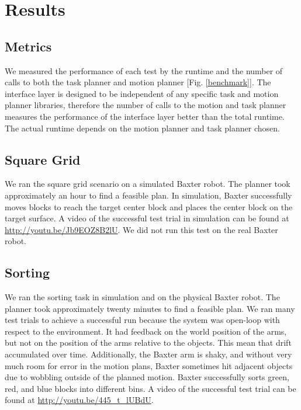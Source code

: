 \documentclass[12pt]{article}
\begin{document}
\section{Results}
\subsection{Metrics}
We measured the performance of each test by the runtime and the number of calls to both the task planner and motion planner [Fig. \ref{benchmark}]. 
The interface layer is designed to be independent of any specific task and motion planner libraries, therefore the number of calls to the motion and task planner measures the performance of the interface layer better than the total runtime. 
The actual runtime depends on the motion planner and task planner chosen.

\subsection{Square Grid}
We ran the square grid scenario on a simulated Baxter robot.
The planner took approximately an hour to find a feasible plan. 
In simulation, Baxter successfully moves blocks to reach the target center block and places the center block on the target surface.
A video of the successful test trial in simulation can be found at \url{http://youtu.be/Jb9EOZ8B2lU}.  
We did not run this test on the real Baxter robot.

\subsection{Sorting}
We ran the sorting task in simulation and on the physical Baxter robot.
The planner took approximately twenty minutes to find a feasible plan. 
We ran many test trials to achieve a successful run because the system was open-loop with respect to the environment.
It had feedback on the world position of the arms, but not on the position of the arms relative to the objects. This mean that drift accumulated over time.
Additionally, the Baxter arm is shaky, and without very much room for error in the motion plans, Baxter sometimes hit adjacent objects due to wobbling outside of the planned motion.
Baxter successfully sorts green, red, and blue blocks into different bins. 
A video of the successful test trial can be found at \url{http://youtu.be/445_t_lUBdU}.
\end{document}
